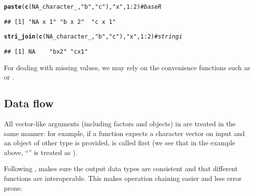 \documentclass[nojss]{jss}\usepackage[]{graphicx}\usepackage[]{xcolor}
\makeatletter
\newcommand{\hlnum}[1]{\textcolor[rgb]{0.686,0.059,0.569}{#1}}%
\newcommand{\hlstr}[1]{\textcolor[rgb]{0.192,0.494,0.8}{#1}}%
\newcommand{\hlcom}[1]{\textcolor[rgb]{0.678,0.584,0.686}{\textit{#1}}}%
\newcommand{\hlopt}[1]{\textcolor[rgb]{0,0,0}{#1}}%
\newcommand{\hlstd}[1]{\textcolor[rgb]{0.345,0.345,0.345}{#1}}%
\newcommand{\hlkwd}[1]{\textcolor[rgb]{0.737,0.353,0.396}{\textbf{#1}}}%
\newenvironment{kframe}{%
 \def\at@end@of@kframe{}%
 \ifinner\ifhmode%
  \def\at@end@of@kframe{\end{minipage}}%
  \begin{minipage}{\columnwidth}%
 \fi\fi%
 \def\FrameCommand##1{\hskip\@totalleftmargin \hskip-\fboxsep
 \colorbox{shadecolor}{##1}\hskip-\fboxsep
     \hskip-\linewidth \hskip-\@totalleftmargin \hskip\columnwidth}%
 \MakeFramed {\advance\hsize-\width
   \@totalleftmargin\z@ \linewidth\hsize
   \@setminipage}}%
 {\par\unskip\endMakeFramed%
 \at@end@of@kframe}
\newenvironment{knitrout}{}{} %
\makeatother
\begin{document}
\begin{knitrout}
\color{fgcolor}\begin{kframe}
\begin{alltt}
\hlkwd{paste}\hlstd{(}\hlkwd{c}\hlstd{(}\hlnum{NA_character_}\hlstd{,} \hlstr{"b"}\hlstd{,} \hlstr{"c"}\hlstd{),} \hlstr{"x"}\hlstd{,} \hlnum{1}\hlopt{:}\hlnum{2}\hlstd{)}  \hlcom{# base R}
\end{alltt}
\begin{verbatim}
## [1] "NA x 1" "b x 2"  "c x 1"
\end{verbatim}
\begin{alltt}
\hlkwd{stri_join}\hlstd{(}\hlkwd{c}\hlstd{(}\hlnum{NA_character_}\hlstd{,} \hlstr{"b"}\hlstd{,} \hlstr{"c"}\hlstd{),} \hlstr{"x"}\hlstd{,} \hlnum{1}\hlopt{:}\hlnum{2}\hlstd{)}  \hlcom{# stringi}
\end{alltt}


{\ttfamily\noindent{}}\begin{verbatim}
## [1] NA    "bx2" "cx1"
\end{verbatim}
\end{kframe}
\end{knitrout}

For dealing with missing values, we may rely on the
convenience functions such as  or
.



\subsection{Data flow}

All vector-like arguments (including factors and objects)
in  are treated in the same manner:
for example, if a function expects a character vector on input
and an object of other type is provided,
 is called first
(we see that in the example above,
``'' is treated as ).












Following \citep{Wickham2010:stringr}, 
makes sure the output data types are consistent
and that different functions are interoperable.
This makes operation chaining easier and less error prone.
\end{document}
